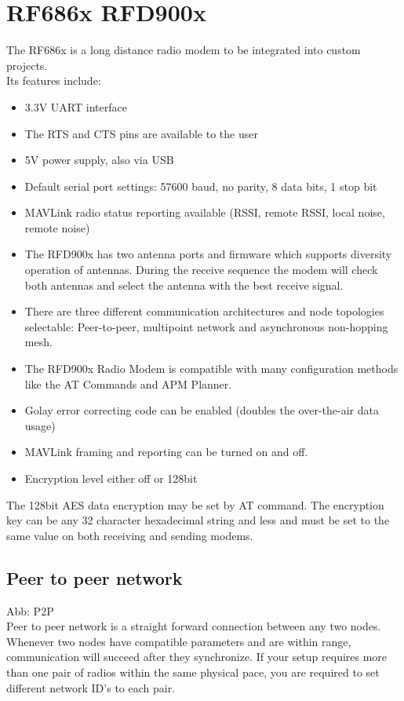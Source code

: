 %
\section{RF686x RFD900x}%
The RF686x is a long distance radio modem to be integrated into custom projects.\\
Its features include: \begin{itemize}
    \item 3.3V UART interface
    \item The RTS and CTS pins are available to the user
    \item 5V power supply, also via USB
    \item Default serial port settings: 57600 baud, no parity, 8 data bits, 1 stop bit
    \item MAVLink radio status reporting available (RSSI, remote RSSI, local noise, remote noise)
    \item The RFD900x has two antenna ports and firmware which supports diversity operation of antennas. During the receive sequence the modem will check both antennas and select the antenna with the best receive signal.
    \item There are three different communication architectures and node topologies selectable: Peer-to-peer, multipoint network and asynchronous non-hopping mesh.
    \item The RFD900x Radio Modem is compatible with many configuration methods like the AT Commands and APM Planner.
    \item Golay error correcting code can be enabled (doubles the over-the-air data usage)
    \item MAVLink framing and reporting can be turned on and off.
    \item Encryption level either off or 128bit 
\end{itemize}
The 128bit AES data encryption may be set by AT command. The encryption key can be any 32 character hexadecimal string and less and must be set to the same value on both receiving and sending modems. 
%
%
\subsection{Peer to peer network}
Abb: P2P\\
Peer to peer network is a straight forward connection between any two nodes. Whenever  two  nodes  have compatible  parameters  and  are within range, communication will succeed after they synchronize. If your setup requires more than one pair of radios within the same physical pace, you are required to set different  network ID’s to each pair. 
%
%
